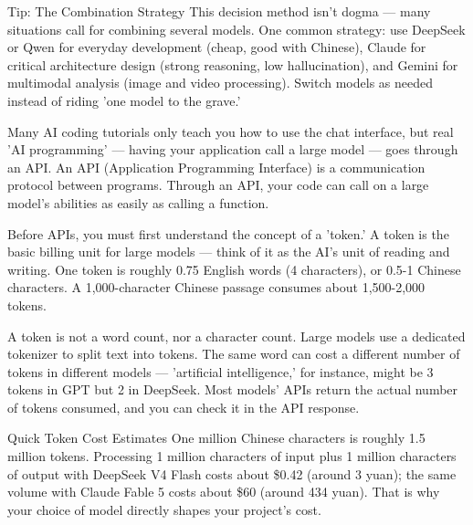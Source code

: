 \begin{tcbinfo}{Tip: The Combination Strategy}
This decision method isn't dogma — many situations call for combining several models. One common strategy: use DeepSeek or Qwen for everyday development (cheap, good with Chinese), Claude for critical architecture design (strong reasoning, low hallucination), and Gemini for multimodal analysis (image and video processing). Switch models as needed instead of riding 'one model to the grave.'

\end{tcbinfo}


Many AI coding tutorials only teach you how to use the chat interface, but real 'AI programming' — having your application call a large model — goes through an API. An API (Application Programming Interface) is a communication protocol between programs. Through an API, your code can call on a large model's abilities as easily as calling a function.


Before APIs, you must first understand the concept of a 'token.' A token is the basic billing unit for large models — think of it as the AI's unit of reading and writing. One token is roughly 0.75 English words (4 characters), or 0.5-1 Chinese characters. A 1,000-character Chinese passage consumes about 1,500-2,000 tokens.

A token is not a word count, nor a character count. Large models use a dedicated tokenizer to split text into tokens. The same word can cost a different number of tokens in different models — 'artificial intelligence,' for instance, might be 3 tokens in GPT but 2 in DeepSeek. Most models' APIs return the actual number of tokens consumed, and you can check it in the API response.

\begin{tcbinfo}{Quick Token Cost Estimates}
One million Chinese characters is roughly 1.5 million tokens. Processing 1 million characters of input plus 1 million characters of output with DeepSeek V4 Flash costs about \$0.42 (around 3 yuan); the same volume with Claude Fable 5 costs about \$60 (around 434 yuan). That is why your choice of model directly shapes your project's cost.

\end{tcbinfo}


